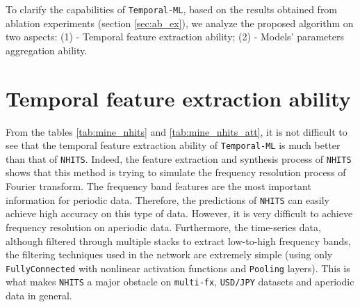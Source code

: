 
To clarify the capabilities of \verb|Temporal-ML|, based on the results obtained from ablation experiments (section \ref{sec:ab_ex}), we analyze the proposed algorithm on two aspects: (1) - Temporal feature extraction ability; (2) - Models' parameters aggregation ability.

\section{Temporal feature extraction ability}


From the tables \ref{tab:mine_nhits} and \ref{tab:mine_nhits_att}, it is not difficult to see that the temporal feature extraction ability of \verb|Temporal-ML| is much better than that of \verb|NHITS|. Indeed, the feature extraction and synthesis process of \verb|NHITS| shows that this method is trying to simulate the frequency resolution process of Fourier transform. The frequency band features are the most important information for periodic data. Therefore, the predictions of \verb|NHITS| can easily achieve high accuracy on this type of data. However, it is very difficult to achieve frequency resolution on aperiodic data. Furthermore, the time-series data, although filtered through multiple stacks to extract low-to-high frequency bands, the filtering techniques used in the network are extremely simple (using only \verb|FullyConnected| with nonlinear activation functions and \verb|Pooling| layers). This is what makes \verb|NHITS| a major obstacle on \verb|multi-fx|, \verb|USD/JPY| datasets and aperiodic data in general.

